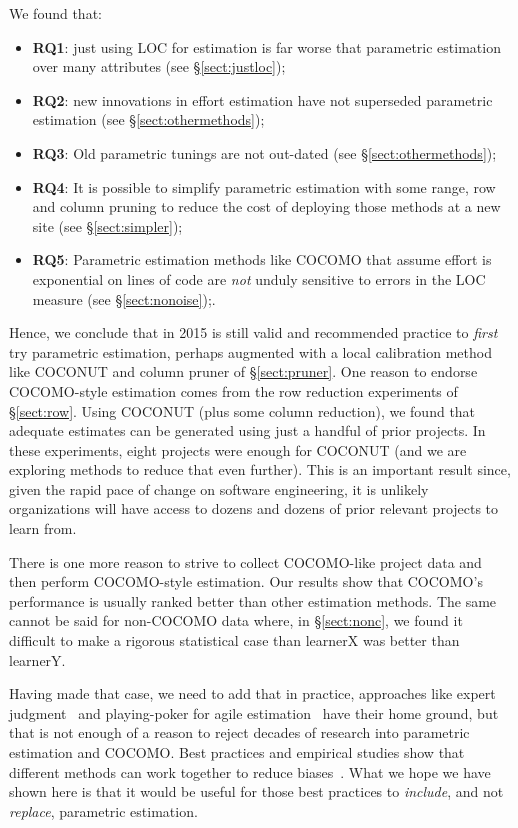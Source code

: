 \documentclass{sig-alternate}
\newcommand{\bi}{\begin{itemize}[leftmargin=0.4cm]}
\newcommand{\ei}{\end{itemize}}
\newcommand{\tion}[1]{\S\ref{sect:#1}}
\begin{document}
We found that:
\bi
\item {\bf RQ1}: just using LOC for estimation is far worse
that parametric estimation over many attributes (see \tion{justloc}); 
\item {\bf RQ2}: new innovations in effort estimation have not superseded parametric estimation (see \tion{othermethods});
\item {\bf RQ3}: Old parametric tunings are not out-dated (see \tion{othermethods});
\item {\bf RQ4}: It is possible to simplify parametric estimation with some range, row and column pruning to reduce the cost
of deploying those methods at a new site (see \tion{simpler});
\item {\bf RQ5}: Parametric estimation methods like COCOMO that assume effort is exponential on lines of code are {\em not} unduly
sensitive to errors in the LOC measure (see \tion{nonoise});.
\ei
Hence, we conclude that in 2015 is still valid and recommended practice to {\em first} try parametric estimation,
perhaps  augmented with a local calibration method like COCONUT
and   column pruner of \tion{pruner}. 
One   reason to endorse COCOMO-style estimation comes from the row reduction experiments of \tion{row}.
Using COCONUT (plus some column reduction), we found that adequate estimates can be generated using
just a handful of prior projects.
In these experiments, eight projects were enough for COCONUT (and we are exploring methods
to reduce that even further). This is an important result since, given the rapid pace of change
on software engineering, it is unlikely organizations will have access to dozens and dozens of prior
relevant projects to learn from.

There is one more reason to strive to collect COCOMO-like project data and then perform COCOMO-style
estimation.  Our results show that COCOMO's performance is usually
ranked better than other estimation methods. The same cannot be said for non-COCOMO data where,
in \tion{nonc}, 
we found it difficult to make a rigorous statistical case than learnerX was better than learnerY.

Having made that case, we need to add that in 
practice, approaches like expert judgment~\cite{jorgensen09}  and
playing-poker for agile estimation~\cite{molokk08} have their home
ground, but that is not enough of a reason to reject decades of research into parametric estimation
and 
COCOMO. Best practices and empirical studies
show that different methods can work together to
reduce biases~\cite{yang08aa}. What we hope we have shown here is that it would be useful for those best practices
to {\em include}, and not {\em replace}, parametric estimation.
\end{document}
